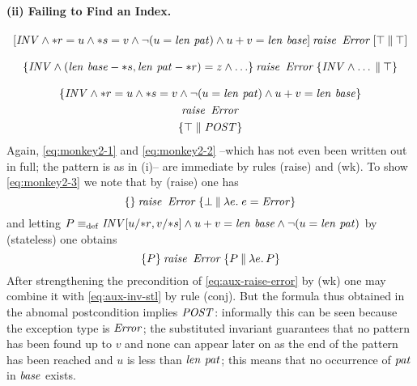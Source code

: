 \paragraph{(ii) Failing to Find an Index.}
\begin{gather}
\label{eq:monkey2-1}
[\mathit{INV} \land {\ast r} = u \land {\ast s} = v \land \lnot(u = \mathit{len}~\mathit{pat})
\land u+v = \mathit{len}~\mathit{base}]\:\mathit{raise}\,~\mathit{Error}\:[\top\:\|\:\top]\\[2ex]
\label{eq:monkey2-2}
\{\mathit{INV} \land (\mathit{len}~\mathit{base} - {\ast s}, \mathit{len}~\mathit{pat} - {\ast r}) = z
  \land \ldots\}\: \mathit{raise}\,~\mathit{Error}\:\{\mathit{INV} \land \ldots\:\|\:\top\}\\[2ex] \nonumber
\{\mathit{INV} \land {\ast r} = u \land {\ast s} = v \land 
 \lnot (u = \mathit{len}~\mathit{pat}) \land u+v = \mathit{len}~\mathit{base}\}\\
\label{eq:monkey2-3}
{\mathit{raise}\,~\mathit{Error}}\\\nonumber
\{\top \parallel \mathit{POST}\}
\end{gather}
Again, \eqref{eq:monkey2-1} and \eqref{eq:monkey2-2} --which has not even been
written out in full; the pattern is as in (i)-- are immediate by rules
(raise) and (wk). To show \eqref{eq:monkey2-3} we note that by (raise) one has 
\begin{equation}
\label{eq:aux-raise-error}
\{\}\:\mathit{raise}\,~\mathit{Error}\:\{\bot\:\|\:\lambda e.\; e = \mathit{Error}\}
\end{equation}
and letting $P \equiv_{\mathrm{def}} \mathit{INV}[u/ {\ast r}, v/ {\ast s}] \land u + v =
\mathit{len}~\mathit{base} \land \lnot(u = \mathit{len}~\mathit{pat})$ by (stateless) one obtains
\begin{equation}\label{eq:aux-inv-stl}
\{P\}\:\mathit{raise}\,~\mathit{Error}\:\{P\:\|\:\lambda e.\, P\}
\end{equation}
After strengthening the precondition of \eqref{eq:aux-raise-error} by (wk) one
may combine it with \eqref{eq:aux-inv-stl} by rule (conj). But the formula thus
obtained in the abnomal postcondition implies $\mathit{POST}$: informally this can
be seen because the exception type is $\mathit{Error}$; the substituted invariant
guarantees that no pattern has been found up to $v$ and none can appear later on
as the end of the pattern has been reached and $u$ is less than
$\mathit{len}~\mathit{pat}$; this means that no occurrence of $\mathit{pat}$ in $\mathit{base}$
exists. 

